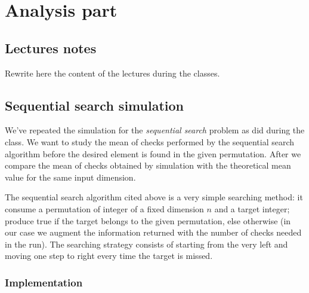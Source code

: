 \documentclass[twoside,openright,titlepage,fleqn,
	headinclude,11pt,a4paper,BCOR5mm,footinclude
	]{scrbook}
\begin{document}
\frenchspacing
\raggedbottom
{}
\pagestyle{plain}

\pagestyle{scrheadings}

\lstset{
	language = R
	, numbers = left 
	, basicstyle=\sffamily%
	, tabsize=2
	, captionpos=b
	, breaklines=true
	, showspaces=false
	, showstringspaces=false
}

\tableofcontents

\newpage



\part{Analysis part}

\chapter{Lectures notes}
Rewrite here the content of the lectures during the classes.

\chapter{Sequential search simulation}

We've repeated the simulation for the \emph{sequential search} problem
as did during the class. We want to study the mean of checks performed
by the sequential search algorithm before the desired element is
found in the given permutation. After we compare the mean of checks
obtained by simulation with the theoretical mean value for the same
input dimension.

The sequential search algorithm cited above is a very simple searching
method: it consume a permutation of integer of a fixed dimension $n$
and a target integer; produce true if the target belongs to the given
permutation, else otherwise (in our case we augment the information
returned with the number of checks needed in the run). The searching
strategy consists of starting from the very left and moving one step
to right every time the target is missed.

\section{Implementation}
\end{document}
